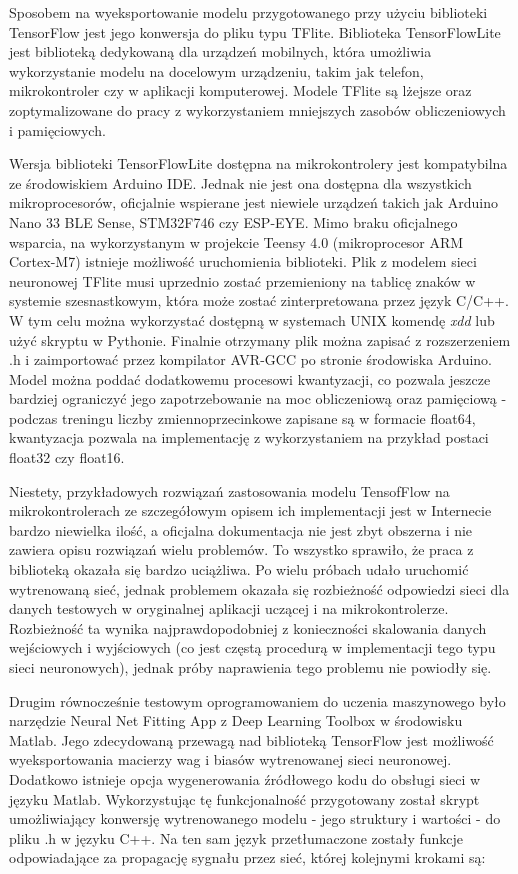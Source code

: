 \documentclass[12pt, a4paper]{article}
\begin{document}
Sposobem na wyeksportowanie modelu przygotowanego przy użyciu biblioteki TensorFlow jest jego konwersja do pliku typu TFlite. Biblioteka TensorFlowLite jest biblioteką dedykowaną dla urządzeń mobilnych, która umożliwia wykorzystanie modelu na docelowym urządzeniu, takim jak telefon, mikrokontroler czy w aplikacji komputerowej. Modele TFlite są lżejsze oraz zoptymalizowane do pracy z wykorzystaniem mniejszych zasobów obliczeniowych i pamięciowych.

Wersja biblioteki TensorFlowLite dostępna na mikrokontrolery jest kompatybilna ze środowiskiem Arduino IDE. Jednak nie jest ona dostępna dla wszystkich mikroprocesorów, oficjalnie wspierane jest niewiele urządzeń takich jak Arduino Nano 33 BLE Sense, STM32F746 czy ESP-EYE. Mimo braku oficjalnego wsparcia, na wykorzystanym w projekcie Teensy 4.0 (mikroprocesor ARM Cortex-M7) istnieje możliwość uruchomienia biblioteki. Plik z modelem sieci neuronowej TFlite musi uprzednio zostać przemieniony na tablicę znaków w systemie szesnastkowym, która może zostać zinterpretowana przez język C/C++. W tym celu można wykorzystać dostępną w systemach UNIX komendę \textit{xdd} lub użyć skryptu w Pythonie. Finalnie otrzymany plik można zapisać z rozszerzeniem .h i zaimportować przez kompilator AVR-GCC po stronie środowiska Arduino. Model można poddać dodatkowemu procesowi kwantyzacji, co pozwala jeszcze bardziej ograniczyć jego zapotrzebowanie na moc obliczeniową oraz pamięciową - podczas treningu liczby zmiennoprzecinkowe zapisane są w formacie float64, kwantyzacja pozwala na implementację z wykorzystaniem na przykład postaci float32 czy float16.

Niestety, przykładowych rozwiązań zastosowania modelu TensofFlow na mikrokontrolerach ze szczegółowym opisem ich implementacji jest w Internecie bardzo niewielka ilość, a oficjalna dokumentacja nie jest zbyt obszerna i nie zawiera opisu rozwiązań wielu problemów. To wszystko sprawiło, że praca z biblioteką okazała się bardzo uciążliwa. Po wielu próbach udało uruchomić wytrenowaną sieć, jednak problemem okazała się rozbieżność odpowiedzi sieci dla danych testowych w oryginalnej aplikacji uczącej i na mikrokontrolerze. Rozbieżność ta wynika najprawdopodobniej z konieczności skalowania danych wejściowych i wyjściowych (co jest częstą procedurą w implementacji tego typu sieci neuronowych), jednak próby naprawienia tego problemu nie powiodły się. 

Drugim równocześnie testowym oprogramowaniem do uczenia maszynowego było narzędzie Neural Net Fitting App z Deep Learning Toolbox w środowisku Matlab. Jego zdecydowaną przewagą nad biblioteką TensorFlow jest możliwość wyeksportowania macierzy wag i biasów wytrenowanej sieci neuronowej. Dodatkowo istnieje opcja wygenerowania źródłowego kodu do obsługi sieci w języku Matlab. Wykorzystując tę funkcjonalność przygotowany został skrypt umożliwiający konwersję wytrenowanego modelu - jego struktury i wartości - do pliku .h w języku C++. Na ten sam język przetłumaczone zostały funkcje odpowiadające za propagację sygnału przez sieć, której kolejnymi krokami są:
\end{document}

